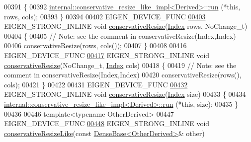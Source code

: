 \begin{DoxyCode}
00391     \{
00392       \hyperlink{struct_eigen_1_1internal_1_1conservative__resize__like__impl}{internal::conservative\_resize\_like\_impl<Derived>::run}
      (*\textcolor{keyword}{this}, rows, cols);
00393     \}
00394 
00402     EIGEN\_DEVICE\_FUNC
\hyperlink{class_eigen_1_1_plain_object_base_a528879aef40f9cbc4ab4925e4a6bceb9}{00403}     EIGEN\_STRONG\_INLINE \textcolor{keywordtype}{void} \hyperlink{class_eigen_1_1_plain_object_base_a528879aef40f9cbc4ab4925e4a6bceb9}{conservativeResize}(\hyperlink{namespace_eigen_a62e77e0933482dafde8fe197d9a2cfde}{Index} rows, NoChange\_t)
00404     \{
00405       \textcolor{comment}{// Note: see the comment in conservativeResize(Index,Index)}
00406       conservativeResize(rows, cols());
00407     \}
00408 
00416     EIGEN\_DEVICE\_FUNC
\hyperlink{class_eigen_1_1_plain_object_base_a46afa73816539b0fe36c6e9abd7978a6}{00417}     EIGEN\_STRONG\_INLINE \textcolor{keywordtype}{void} \hyperlink{class_eigen_1_1_plain_object_base_a46afa73816539b0fe36c6e9abd7978a6}{conservativeResize}(NoChange\_t, 
      \hyperlink{namespace_eigen_a62e77e0933482dafde8fe197d9a2cfde}{Index} cols)
00418     \{
00419       \textcolor{comment}{// Note: see the comment in conservativeResize(Index,Index)}
00420       conservativeResize(rows(), cols);
00421     \}
00422 
00431     EIGEN\_DEVICE\_FUNC
\hyperlink{class_eigen_1_1_plain_object_base_a5429214e7c1ffaf7294a93a5cec62007}{00432}     EIGEN\_STRONG\_INLINE \textcolor{keywordtype}{void} \hyperlink{class_eigen_1_1_plain_object_base_a5429214e7c1ffaf7294a93a5cec62007}{conservativeResize}(\hyperlink{namespace_eigen_a62e77e0933482dafde8fe197d9a2cfde}{Index} size)
00433     \{
00434       \hyperlink{struct_eigen_1_1internal_1_1conservative__resize__like__impl}{internal::conservative\_resize\_like\_impl<Derived>::run}
      (*\textcolor{keyword}{this}, size);
00435     \}
00436 
00446     \textcolor{keyword}{template}<\textcolor{keyword}{typename} OtherDerived>
00447     EIGEN\_DEVICE\_FUNC
\hyperlink{class_eigen_1_1_plain_object_base_a7775d274035c4ef541aa0fc9a3ad30a2}{00448}     EIGEN\_STRONG\_INLINE \textcolor{keywordtype}{void} \hyperlink{class_eigen_1_1_plain_object_base_a7775d274035c4ef541aa0fc9a3ad30a2}{conservativeResizeLike}(\textcolor{keyword}{const} 
      \hyperlink{group___core___module_class_eigen_1_1_dense_base}{DenseBase<OtherDerived>}& other)

\end{DoxyCode}
